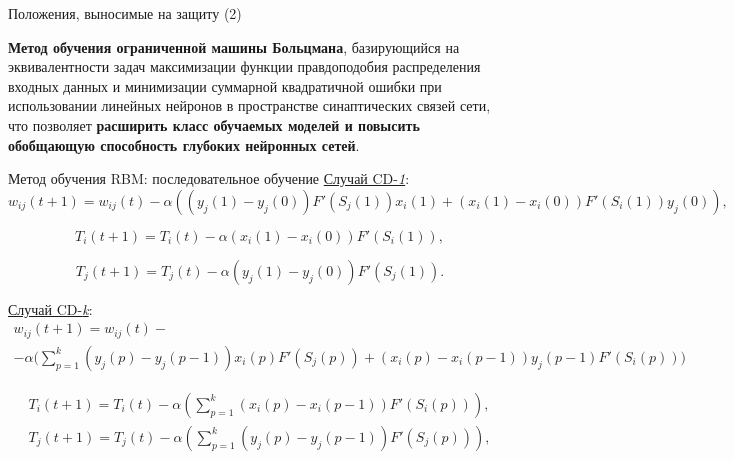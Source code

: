 \documentclass[10pt]{beamer}
\begin{document}
        \begin{frame}{Положения, выносимые на защиту (2)}
            \begin{block}{2}
                \large
                \textbf{Метод обучения ограниченной машины Больцмана}, базирующийся на эквивалентности задач максимизации функции правдоподобия распределения входных данных и минимизации суммарной квадратичной ошибки при использовании линейных нейронов в пространстве синаптических связей сети, что позволяет \textbf{расширить класс обучаемых моделей и повысить обобщающую способность глубоких нейронных сетей}.
            \end{block}
        \end{frame}

        \begin{frame}{Метод обучения RBM: последовательное обучение}
            \underline{Случай CD-\textit{1}}:
            \begin{equation*}
                w_{ij}(t+1)=w_{ij}(t)-\alpha((y_j(1)-y_j(0))F'(S_j(1))x_i(1)+(x_i(1)-x_i(0))F'(S_i(1))y_j(0)),
            \end{equation*}

            \begin{equation*}
                T_i(t+1)=T_i(t)-\alpha(x_i(1)-x_i(0))F'(S_i(1)),
            \end{equation*}

            \begin{equation*}
                T_j(t+1)=T_j(t)-\alpha(y_j(1)-y_j(0))F'(S_j(1)).  
            \end{equation*}
            
            \underline{Случай CD-\textit{k}}:
            \begin{multline*}
                w_{ij}(t+1)=w_{ij}(t)-\\-\alpha\Bigg(\sum_{p=1}^k (y_j(p)-y_j(p-1))x_i(p)F'(S_j(p))+(x_i(p)-x_i(p-1))y_j(p-1)F'(S_i(p))\Bigg)
            \end{multline*}

            \begin{equation*}
            \begin{aligned}
                T_i(t+1)=T_i(t)-\alpha\left(\sum_{p=1}^k (x_i(p)-x_i(p-1))F'(S_i(p))\right),\\
                T_j(t+1)=T_j(t)-\alpha\left(\sum_{p=1}^k (y_j(p)-y_j(p-1))F'(S_j(p))\right),
            \end{aligned}
            \end{equation*}
        \end{frame}
\end{document}
